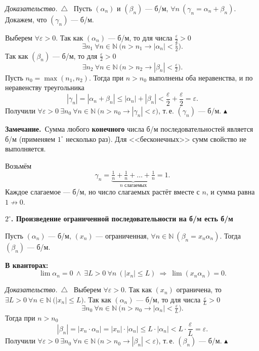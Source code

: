 \documentclass[a4paper,11pt]{article}
\newcommand{\N}{\mathbb{N}}
\newcommand{\eps}{\varepsilon}
\newcommand{\kv}{\par\noindent\textbf{\textcolor{oprc!85!black}{В кванторах:}}}
\newcommand{\zam}{\par\smallskip\noindent\textbf{\textcolor{zamc}{Замечание.}}\ }
\newenvironment{dok}
  {\par\smallskip\noindent\textit{Доказательство.}\ $\triangle$\ \ignorespaces}
  {\unskip\nobreak\hfill$\blacktriangle$\par\smallskip}
\newcommand{\podr}[1]{\par\needspace{8\baselineskip}\medskip
  {\large\bfseries\textcolor{oprc!80!black}{#1}}\par\nopagebreak\smallskip}
\begin{document}
\begin{dok}
Пусть $(\alpha_n)$ и $(\beta_n)$ --- б/м, $\forall n\ (\gamma_n = \alpha_n + \beta_n)$. Докажем, что $(\gamma_n)$ --- б/м.

Выберем $\forall \eps > 0$. Так как $(\alpha_n)$ --- б/м, то для числа $\frac{\eps}{2} > 0$
\[
  \exists n_1\ \forall n \in \N\ \bigl(n > n_1 \to |\alpha_n| < \tfrac{\eps}{2}\bigr).
\]
Так как $(\beta_n)$ --- б/м, то для $\frac{\eps}{2} > 0$
\[
  \exists n_2\ \forall n \in \N\ \bigl(n > n_2 \to |\beta_n| < \tfrac{\eps}{2}\bigr).
\]
Пусть $n_0 = \max(n_1, n_2)$. Тогда при $n > n_0$ выполнены оба неравенства, и по неравенству треугольника
\[
  |\gamma_n| = |\alpha_n + \beta_n| \le |\alpha_n| + |\beta_n| < \frac{\eps}{2} + \frac{\eps}{2} = \eps.
\]
Получили
$\forall \eps > 0\ \exists n_0\ \forall n \in \N\ \bigl(n > n_0 \to |\gamma_n| < \eps\bigr)$, т.\,е. $(\gamma_n)$ --- б/м.
\end{dok}

\zam Сумма любого \textbf{конечного} числа б/м последовательностей является б/м (применяем $1^\circ$ несколько раз).
Для <<бесконечных>> сумм свойство не выполняется.

\begin{dop}
Возьмём
\[
  \gamma_n = \underbrace{\tfrac1n + \tfrac1n + \dots + \tfrac1n}_{n \text{ слагаемых}} = 1.
\]
Каждое слагаемое --- б/м, но число слагаемых растёт вместе с $n$, и сумма равна $1 \not\to 0$.
\end{dop}

\podr{$2^\circ$. Произведение ограниченной последовательности на б/м есть б/м}

\begin{teo}[$2^\circ$]
Пусть $(\alpha_n)$ --- б/м, $(x_n)$ --- ограниченная, $\forall n \in \N\ (\beta_n = x_n \alpha_n)$. Тогда $(\beta_n)$ --- б/м.
\kv
\[
  \lim \alpha_n = 0 \ \wedge\ \exists L > 0\ \forall n\ (|x_n| \le L) \ \Longrightarrow\ \lim (x_n \alpha_n) = 0.
\]
\end{teo}

\begin{dok}
Выберем $\forall \eps > 0$. Так как $(x_n)$ ограничена, то $\exists L > 0\ \forall n \in \N\ \bigl(|x_n| \le L\bigr)$.
Так как $(\alpha_n)$ --- б/м, то для числа $\frac{\eps}{L} > 0$
\[
  \exists n_0\ \forall n \in \N\ \bigl(n > n_0 \to |\alpha_n| < \tfrac{\eps}{L}\bigr).
\]
Тогда при $n > n_0$
\[
  |\beta_n| = |x_n \cdot \alpha_n| = |x_n| \cdot |\alpha_n| \le L \cdot |\alpha_n| < L \cdot \frac{\eps}{L} = \eps.
\]
Получили
$\forall \eps > 0\ \exists n_0\ \forall n \in \N\ \bigl(n > n_0 \to |\beta_n| < \eps\bigr)$, т.\,е. $(\beta_n)$ --- б/м.
\end{dok}
\end{document}
